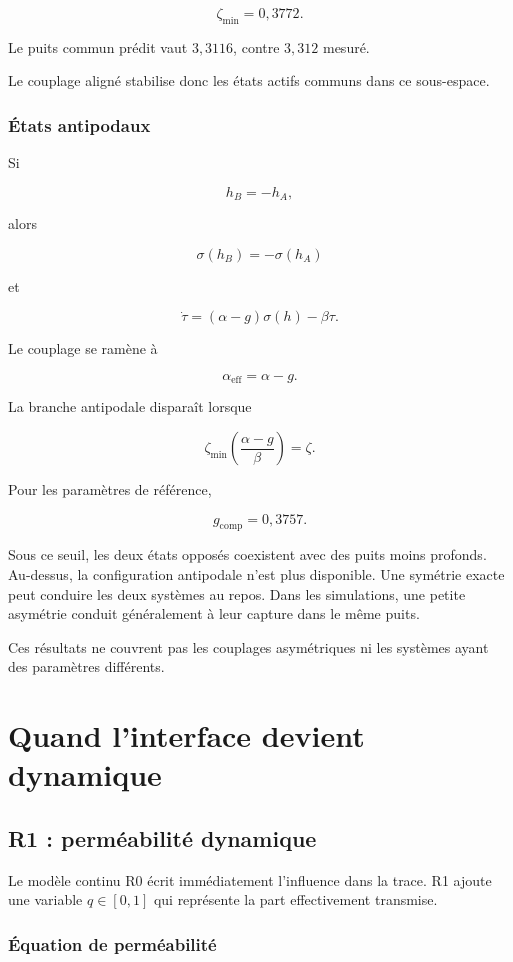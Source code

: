 \[
\zeta_{\min}=0{,}3772.
\]

Le puits commun prédit vaut \(3{,}3116\), contre \(3{,}312\) mesuré.

Le couplage aligné stabilise donc les états actifs communs dans ce
sous-espace.

\section{États antipodaux}\label{t2-etats-antipodaux}

Si

\[
h_B=-h_A,
\]

alors

\[
\sigma(h_B)=-\sigma(h_A)
\]

et

\[
\dot\tau
=
(\alpha-g)\sigma(h)-\beta\tau.
\]

Le couplage se ramène à

\[
\alpha_{\mathrm{eff}}=\alpha-g.
\]

La branche antipodale disparaît lorsque

\[
\zeta_{\min}\!\left(\frac{\alpha-g}{\beta}\right)=\zeta.
\]

Pour les paramètres de référence,

\[
g_{\mathrm{comp}}=0{,}3757.
\]

Sous ce seuil, les deux états opposés coexistent avec des puits moins profonds. Au-dessus, la configuration antipodale n'est plus disponible. Une symétrie exacte peut conduire les deux systèmes au repos. Dans les simulations, une petite asymétrie conduit généralement à leur capture dans le même puits.

Ces résultats ne couvrent pas les couplages asymétriques ni les systèmes ayant des paramètres différents.


\part{Quand l’interface devient dynamique}
\chapter{R1 : perméabilité dynamique}\label{t2-r1-permeabilite-dynamique}

Le modèle continu R0 écrit immédiatement l'influence dans la trace. R1
ajoute une variable \(q\in[0,1]\) qui représente la part effectivement
transmise.

\section{Équation de perméabilité}\label{t2-equation-de-permeabilite}

